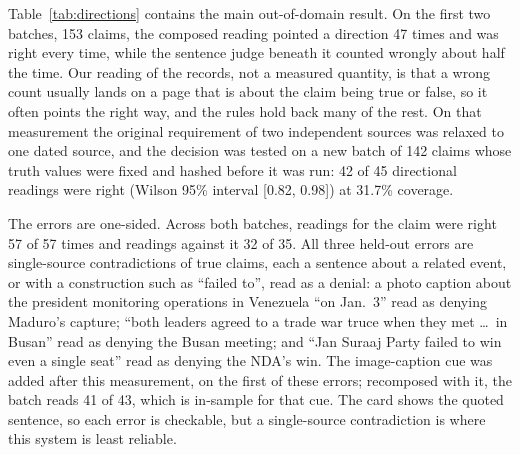 \documentclass[11pt]{article}
\begin{document}
Table~\ref{tab:directions} contains the main out-of-domain result. On the first two batches, 153 claims,
the composed reading pointed a direction 47 times and was right every time, while the sentence judge beneath
it counted wrongly about half the time. Our reading of the records, not a measured quantity, is that a wrong
count usually lands on a page that is about the claim being true or false, so it often points the right way,
and the rules hold back many of the rest. On that measurement the original requirement of two independent
sources was relaxed to one dated source, and the decision was tested on a new batch of 142 claims whose
truth values were fixed and hashed before it was run: 42 of 45 directional readings were right (Wilson 95\%
interval [0.82, 0.98]) at 31.7\% coverage.

The errors are one-sided. Across both batches, readings for the claim were right 57 of 57 times and
readings against it 32 of 35. All three held-out errors are single-source contradictions of true claims,
each a sentence about a related event, or with a construction such as ``failed to'', read as a denial: a
photo caption about the president monitoring operations in Venezuela ``on Jan.~3'' read as denying
Maduro's capture; ``both leaders agreed to a trade war truce when they met \ldots\ in Busan'' read as
denying the Busan meeting; and ``Jan Suraaj Party failed to win even a single seat'' read as denying the
NDA's win. The image-caption cue was added after this measurement, on the first of these errors;
recomposed with it, the batch reads 41 of 43, which is in-sample for that cue. The card shows the quoted
sentence, so each error is checkable, but a single-source contradiction is where this system is least
reliable.
\end{document}
